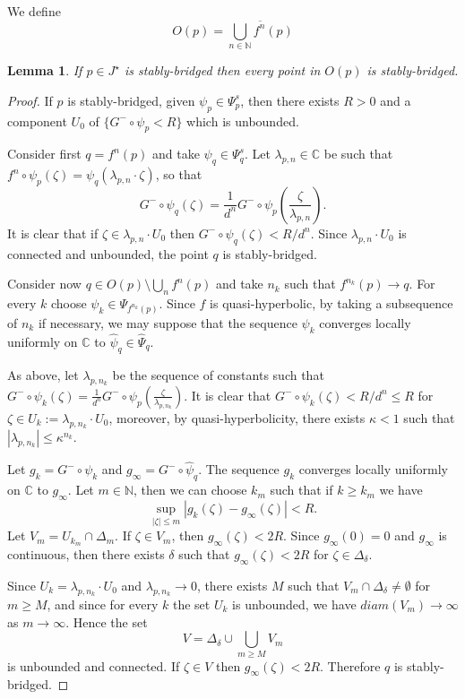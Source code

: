 \documentclass[10pt,a4paper]{article}
\newtheorem{lemma}[theorem]{Lemma}
\begin{document}
We define
\[
O(p)=\overline{\bigcup_{n\in \mathbb N}f^n(p)}
\]
\begin{lemma}
\label{bridgedorbit}
If $p\in J^\star$ is stably-bridged then every point in $O(p)$ is stably-bridged.
\end{lemma}
\begin{proof}
If $p$ is stably-bridged, given $\psi_p\in\Psi^s_p$, then there exists $R>0$ and a component $U_0$ of $\{G^-\circ\psi_p<R\}$ which is unbounded.

Consider first $q=f^n(p)$ and take $\psi_q\in\Psi^s_q$. Let $\lambda_{p,n} \in \mathbb C$ be such that $f^n\circ\psi_p(\zeta)=\psi_q(\lambda_{p,n}\cdot \zeta)$, so that
\[
G^-\circ\psi_q(\zeta)=\frac{1}{d^n}G^-\circ\psi_p\left(\frac{\zeta}{\lambda_{p,n}}\right).
\]
It is clear that if $\zeta\in\lambda_{p,n} \cdot U_0$  then $G^-\circ\psi_q(\zeta)<R/d^n$. Since $\lambda_{p,n}\cdot U_0$ is connected and unbounded, the point $q$ is stably-bridged.

Consider now $q\in O(p)\setminus \bigcup_n f^n(p)$ and take $n_k$ such that $f^{n_k}(p)\to q$. For every $k$ choose $\psi_k\in\Psi_{f^{n_k}(p)}$. Since $f$ is quasi-hyperbolic, by taking a subsequence of $n_k$ if necessary, we may suppose that the sequence $\psi_k$ converges locally uniformly on $\mathbb C$ to $\widehat\psi_q\in\widehat\Psi_q$.

As above, let $\lambda_{p,n_k}$ be the sequence of constants such that $G^-\circ\psi_k(\zeta)=\frac{1}{d^n}G^-\circ\psi_p\left(\frac{\zeta}{\lambda_{p,n_k}}\right)$. It is clear that $G^-\circ \psi_k(\zeta)<R/d^n\leq R$ for $\zeta\in U_k:=\lambda_{p,n_k}\cdot U_0$, moreover, by quasi-hyperbolicity, there exists $\kappa<1$ such that $|\lambda_{p,n_k}|\leq \kappa^{n_k}$.

Let $g_k=G^-\circ \psi_k$ and $g_\infty=G^-\circ\widehat\psi_q$. The sequence $g_k$ converges locally uniformly on $\mathbb C$ to $g_\infty$. Let $m\in\mathbb N$, then we can choose $k_m$ such that if $k\geq k_m$ we have
\[
\sup_{|\zeta|\leq m}|g_k(\zeta)-g_\infty(\zeta)|<R.
\]
Let $V_m=U_{k_m}\cap\Delta_m$. If $\zeta\in V_m$, then $g_\infty(\zeta)<2R$. Since $g_\infty(0)=0$ and $g_\infty$ is continuous, then there exists $\delta$ such that $g_\infty(\zeta)<2R$ for $\zeta\in\Delta_\delta$.

Since $U_k=\lambda_{p,n_k}\cdot U_0$ and $\lambda_{p,n_k}\to 0$, there exists $M$ such that $V_m\cap \Delta_\delta\neq\emptyset$ for $m\geq M$, and since for every $k$ the set $U_k$ is unbounded, we have $diam(V_m)\to\infty$ as $m\to\infty$. Hence the set
\[
V=\Delta_\delta\cup\bigcup_{m\geq M}V_m
\]
is unbounded and connected. If $\zeta\in V$ then $g_\infty(\zeta)<2R$. Therefore $q$ is stably-bridged.
\end{proof}
\end{document}
